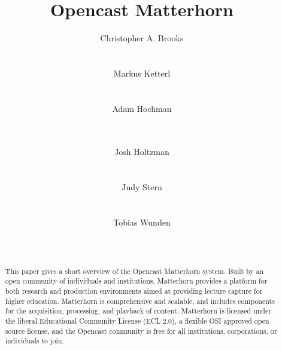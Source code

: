 \documentclass{sig-alternate}
\begin{document}
\title{Opencast Matterhorn}

\author{
%
\alignauthor
		Christopher A. Brooks \\
       \\
       \\
%
\alignauthor
		Markus Ketterl \titlenote{}\\
       \\
       \\
%
\alignauthor
		Adam Hochman\\
       \\
       \\
\and
%
\alignauthor
		Josh Holtzman\\
       \\
       \\
%
\alignauthor
		Judy Stern\\
       \\
       \\
%
\alignauthor
		Tobias Wunden\\
       \\
       \\
}


\maketitle
\begin{abstract}
This paper gives a short overview of the Opencast Matterhorn system.  Built by an open community of individuals and institutions, Matterhorn provides a platform for both research and production environments aimed at providing lecture capture for higher education.  Matterhorn is comprehensive and scalable, and includes components for the acquisition, processing, and playback of content.  Matterhorn is licensed under the liberal Educational Community License (ECL 2.0), a flexible OSI approved open source license, and the Opencast community is free for all institutions, corporations, or individuals to join.
\end{abstract}
\end{document}

